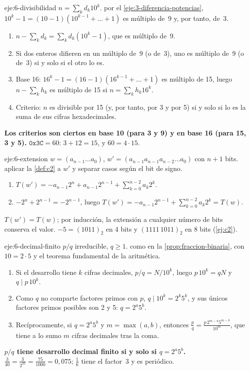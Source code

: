 \begin{solucion}{eje:6-divisibilidad}
\datos $n=\sum_kd_k10^k$.
\planteamiento por el \cref{eje:3-diferencia-potencias}, $10^k-1=(10-1)(10^{k-1}+\dots+1)$ es múltiplo de~9 y, por tanto, de~3.
\pasos
\begin{enumerate}[label=\arabic*.]
  \item $n-\sum_kd_k=\sum_kd_k(10^k-1)$, que es múltiplo de~9.
  \item Si dos enteros difieren en un múltiplo de~9 (o de~3), uno es múltiplo de~9 (o de~3) si y solo si el otro lo es.
  \item Base 16: $16^k-1=(16-1)(16^{k-1}+\dots+1)$ es múltiplo de 15, luego $n-\sum_kh_k$ es múltiplo de 15 si $n=\sum_kh_k16^k$.
  \item Criterio: $n$ es divisible por 15 (y, por tanto, por 3 y por 5) si y solo si lo es la suma de sus cifras hexadecimales.
\end{enumerate}
\resultado \textbf{Los criterios son ciertos en base 10 (para 3 y 9) y en base 16 (para 15, 3 y 5).}
\comprobacion $\texttt{0x3C}=60$: $3+12=15$, y $60=4\cdot15$.
\end{solucion}

\begin{solucion}{eje:6-extension}
\datos $w=(a_{n-1}\dots a_0)$, $w'=(a_{n-1}a_{n-1}a_{n-2}\dots a_0)$ con $n+1$ bits.
\planteamiento aplicar la \cref{def:c2} a $w'$ y separar casos según el bit de signo.
\pasos
\begin{enumerate}[label=\arabic*.]
  \item $T(w')=-a_{n-1}2^{n}+a_{n-1}2^{n-1}+\sum_{k=0}^{n-2}a_k2^k$.
  \item $-2^n+2^{n-1}=-2^{n-1}$, luego $T(w')=-a_{n-1}2^{n-1}+\sum_{k=0}^{n-2}a_k2^k=T(w)$.
\end{enumerate}
\resultado \textbf{$T(w')=T(w)$}; por inducción, la extensión a cualquier número de bits conserva el valor.
\comprobacion $-5=(1011)_2$ en 4 bits y $(1111\,1011)_2$ en 8 bits (\cref{ej:c2}).
\end{solucion}

\begin{solucion}{eje:6-decimal-finito}
\datos $p/q$ irreducible, $q\ge1$.
\planteamiento como en la \cref{prop:fraccion-binaria}, con $10=2\cdot5$ y el teorema fundamental de la aritmética.
\pasos
\begin{enumerate}[label=\arabic*.]
  \item Si el desarrollo tiene $k$ cifras decimales, $p/q=N/10^k$, luego $p\,10^k=qN$ y $q\mid p\,10^k$.
  \item Como $q$ no comparte factores primos con $p$, $q\mid10^k=2^k5^k$, y sus únicos factores primos posibles son 2 y 5: $q=2^a5^b$.
  \item Recíprocamente, si $q=2^a5^b$ y $m=\max(a,b)$, entonces $\frac pq=\frac{p\,2^{m-a}5^{m-b}}{10^m}$, que tiene a lo sumo $m$ cifras decimales tras la coma.
\end{enumerate}
\resultado \textbf{$p/q$ tiene desarrollo decimal finito si y solo si $q=2^a5^b$.}
\comprobacion $\frac3{40}=\frac3{2^35}=\frac{75}{1000}=0{,}075$; $\frac16$ tiene el factor~3 y es periódico.
\end{solucion}

